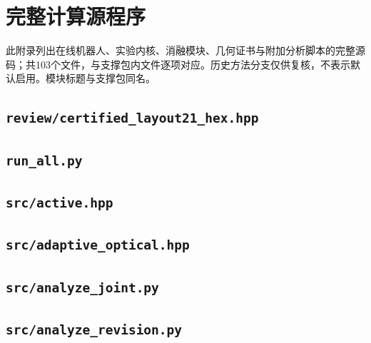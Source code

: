 \section{完整计算源程序}\small 此附录列出在线机器人、实验内核、消融模块、几何证书与附加分析脚本的完整源码；共103个文件，与支撑包内文件逐项对应。历史方法分支仅供复核，不表示默认启用。模块标题与支撑包同名。
\subsection*{\texttt{review/certified\_layout21\_hex.hpp}}

\clearpage
\subsection*{\texttt{run\_all.py}}

\subsection*{\texttt{src/active.hpp}}

\subsection*{\texttt{src/adaptive\_optical.hpp}}

\subsection*{\texttt{src/analyze\_joint.py}}

\subsection*{\texttt{src/analyze\_revision.py}}

